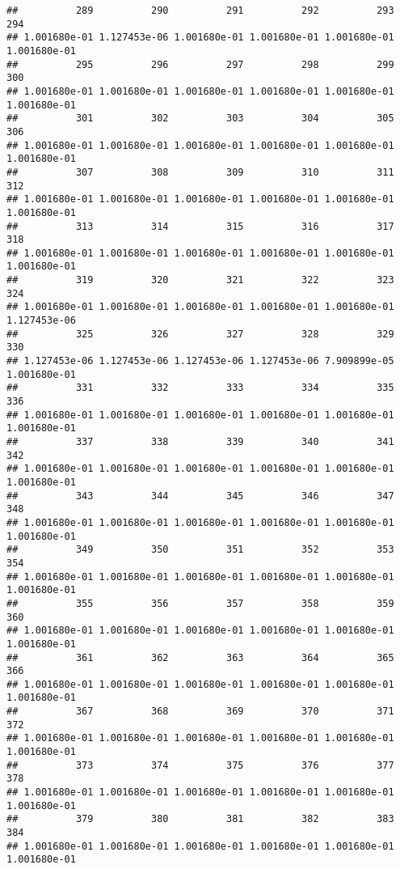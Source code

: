 \documentclass[
]{article}
\begin{document}
\begin{verbatim}
##          289          290          291          292          293          294 
## 1.001680e-01 1.127453e-06 1.001680e-01 1.001680e-01 1.001680e-01 1.001680e-01 
##          295          296          297          298          299          300 
## 1.001680e-01 1.001680e-01 1.001680e-01 1.001680e-01 1.001680e-01 1.001680e-01 
##          301          302          303          304          305          306 
## 1.001680e-01 1.001680e-01 1.001680e-01 1.001680e-01 1.001680e-01 1.001680e-01 
##          307          308          309          310          311          312 
## 1.001680e-01 1.001680e-01 1.001680e-01 1.001680e-01 1.001680e-01 1.001680e-01 
##          313          314          315          316          317          318 
## 1.001680e-01 1.001680e-01 1.001680e-01 1.001680e-01 1.001680e-01 1.001680e-01 
##          319          320          321          322          323          324 
## 1.001680e-01 1.001680e-01 1.001680e-01 1.001680e-01 1.001680e-01 1.127453e-06 
##          325          326          327          328          329          330 
## 1.127453e-06 1.127453e-06 1.127453e-06 1.127453e-06 7.909899e-05 1.001680e-01 
##          331          332          333          334          335          336 
## 1.001680e-01 1.001680e-01 1.001680e-01 1.001680e-01 1.001680e-01 1.001680e-01 
##          337          338          339          340          341          342 
## 1.001680e-01 1.001680e-01 1.001680e-01 1.001680e-01 1.001680e-01 1.001680e-01 
##          343          344          345          346          347          348 
## 1.001680e-01 1.001680e-01 1.001680e-01 1.001680e-01 1.001680e-01 1.001680e-01 
##          349          350          351          352          353          354 
## 1.001680e-01 1.001680e-01 1.001680e-01 1.001680e-01 1.001680e-01 1.001680e-01 
##          355          356          357          358          359          360 
## 1.001680e-01 1.001680e-01 1.001680e-01 1.001680e-01 1.001680e-01 1.001680e-01 
##          361          362          363          364          365          366 
## 1.001680e-01 1.001680e-01 1.001680e-01 1.001680e-01 1.001680e-01 1.001680e-01 
##          367          368          369          370          371          372 
## 1.001680e-01 1.001680e-01 1.001680e-01 1.001680e-01 1.001680e-01 1.001680e-01 
##          373          374          375          376          377          378 
## 1.001680e-01 1.001680e-01 1.001680e-01 1.001680e-01 1.001680e-01 1.001680e-01 
##          379          380          381          382          383          384 
## 1.001680e-01 1.001680e-01 1.001680e-01 1.001680e-01 1.001680e-01 1.001680e-01 

\end{verbatim}
\end{document}
